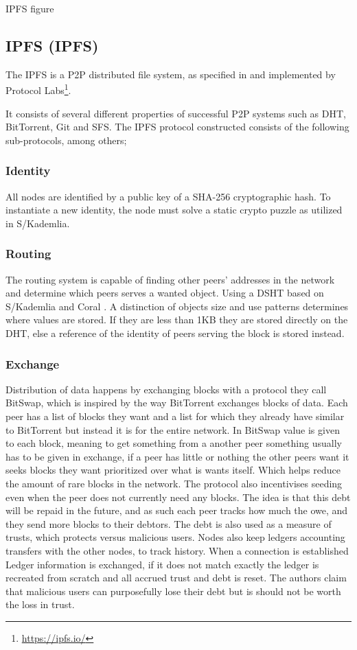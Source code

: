 IPFS figure

\subsection{\acl{IPFS} (\acs{IPFS})}
The \acs{IPFS} is a \acs{P2P} distributed file system, as specified in \cite{benet2014ipfs} and implemented by Protocol Labs\footnote{\url{https://ipfs.io/}}.

It consists of several different properties of successful \acs{P2P} systems such as \acs{DHT}, BitTorrent, Git and \ac{SFS}. The \acs{IPFS} protocol constructed consists of the following sub-protocols, among others;

\subsubsection{Identity}
All nodes are identified by a public key of a SHA-256 cryptographic hash. To instantiate a new identity, the node must solve a static crypto puzzle as utilized in S/Kademlia\cite{baumgart2007skademlia}.

\subsubsection{Routing}
The routing system is capable of finding other peers' addresses in the network and determine which peers serves a wanted object. Using a \acs{DSHT} based on S/Kademlia and Coral \cite{baumgart2007skademlia, freedman2004coral}. A distinction of objects size and use patterns determines where values are stored. If they are less than 1KB they are stored directly on the \acs{DHT}, else a reference of the identity of peers serving the block is stored instead. 

\subsubsection{Exchange}
Distribution of data happens by exchanging blocks with a protocol they call BitSwap, which is inspired by the way BitTorrent exchanges blocks of data. Each peer has a list of blocks they want and a list for which they already have similar to BitTorrent but instead it is for the entire network. In BitSwap value is given to each block, meaning to get something from a another peer something usually has to be given in exchange, if a peer has little or nothing the other peers want it seeks blocks they want prioritized over what is wants itself. Which helps reduce the amount of rare blocks in the network.
The protocol also incentivises seeding even when the peer does not currently need any blocks. The idea is that this debt will be repaid in the future, and as such each peer tracks how much the owe, and they send more blocks to their debtors. The debt is also used as a measure of trusts, which protects versus malicious users.
Nodes also keep ledgers accounting transfers with the other nodes, to track history. When a connection is established Ledger information is exchanged, if it does not match exactly the ledger is recreated from scratch and all accrued trust and debt is reset. The authors claim that malicious users can purposefully lose their debt but is should not be worth the loss in trust.

